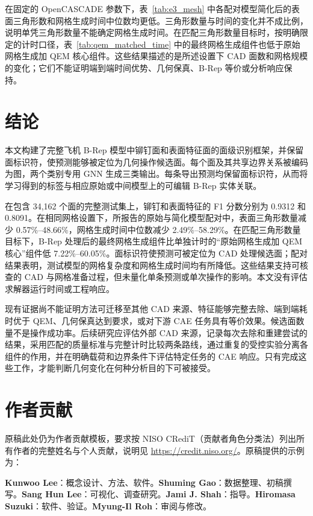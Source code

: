 \documentclass[12pt,a4paper]{ctexart}
\begin{document}
在固定的 OpenCASCADE 参数下，表~\ref{tab:e3_mesh} 中各配对模型简化后的表面三角形数和网格生成时间中位数均更低。三角形数量与时间的变化并不成比例，说明单凭三角形数量不能确定网格生成时间。在匹配三角形数量目标时，按明确限定的计时口径，表~\ref{tab:qem_matched_time} 中的最终网格生成组件也低于原始网格生成加 QEM 核心组件。这些结果描述的是所述设置下 CAD 面数和网格规模的变化；它们不能证明端到端时间优势、几何保真、B-Rep 等价或分析响应保持。

\section{结论}
本文构建了完整飞机 B-Rep 模型中铆钉面和表面特征面的面级识别框架，并保留面标识符，使预测能够被定位为几何操作候选面。每个面及其共享边界关系被编码为图，两个类别专用 GNN 生成三类输出。每条导出预测均保留面标识符，从而将学习得到的标签与相应原始或中间模型上的可编辑 B-Rep 实体关联。

在包含 34,162 个面的完整测试集上，铆钉和表面特征的 F1 分数分别为 0.9312 和 0.8091。在相同网格设置下，所报告的原始与简化模型配对中，表面三角形数量减少 0.57\%--48.66\%，网格生成时间中位数减少 2.49\%--58.29\%。在匹配三角形数量目标下，B-Rep 处理后的最终网格生成组件比单独计时的“原始网格生成加 QEM 核心”组件低 7.22\%--60.05\%。面标识符使预测可被定位为 CAD 处理候选面；配对结果表明，测试模型的网格复杂度和网格生成时间均有所降低。这些结果支持可核查的 CAD 与网格准备过程，但未量化单条预测或单次操作的影响。本文没有评估求解器运行时间或工程响应。

现有证据尚不能证明方法可迁移至其他 CAD 来源、特征能够完整去除、端到端耗时优于 QEM、几何保真达到要求，或对下游 CAE 任务具有等价效果。候选面数量不是操作成功率。后续研究应评估外部 CAD 来源，记录每次去除和重建尝试的结果，采用匹配的质量标准与完整计时比较两条路线，通过重复的受控实验分离各组件的作用，并在明确载荷和边界条件下评估特定任务的 CAE 响应。只有完成这些工作，才能判断几何变化在何种分析目的下可被接受。

\section*{作者贡献}
原稿此处仍为作者贡献模板，要求按 NISO CRediT（贡献者角色分类法）列出所有作者的完整姓名与个人贡献，说明见 \url{https://credit.niso.org/}。原稿提供的示例为：

\noindent\textbf{Kunwoo Lee}：概念设计、方法、软件。\textbf{Shuming Gao}：数据整理、初稿撰写。\textbf{Sang Hun Lee}：可视化、调查研究。\textbf{Jami J. Shah}：指导。\textbf{Hiromasa Suzuki}：软件、验证。\textbf{Myung-Il Roh}：审阅与修改。
\end{document}
